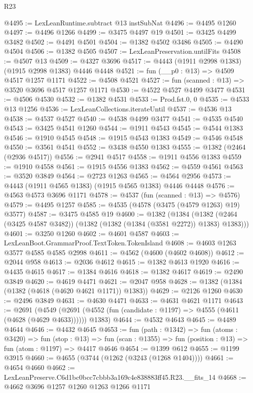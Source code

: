 \begin{lexlean}{R23}
\begin{coremodule}
@4495 := LexLeanRuntime.subtract @13 instSubNat
@4496 := @4495 @1260
@4497 := @4496 @1266
@4499 := @3475 @4497 @19
@4501 := @3425 @4499 @3482
@4502 := @4491 @4501
@4504 := @1382 @4502 @3486
@4505 := @4490 @4504
@4506 := @1382 @4505
@4507 := LexLeanPreservation.untilFits
@4508 := @4507 @13
@4509 := @4327 @3696
@4517 := @4443 (@1911 @2998 @1383) (@1915 @2998 @1383) @4446 @4448
@4521 := fun (__p0 : @13) => @4509 @4517 @1257 @1171
@4522 := @4508 @4521
@4527 := fun (scanned : @13) => @3520 @3696 @4517 @1257 @1171
@4530 := @4522 @4527 @4499 @3477
@4531 := @4506 @4530
@4532 := @1382 @4531
@4533 := Prod.fst.{0, 0}
@4535 := @4533 @13 @1256
@4536 := LexLeanCollections.iterateUntil
@4537 := @4536 @13
@4538 := @4537 @4527
@4540 := @4538 @4499 @3477
@4541 := @4535 @4540
@4543 := @3425 @4541 @1260
@4544 := @1911 @4543
@4545 := @4544 @1383
@4546 := @1910 @4545
@4548 := @1915 @4543 @1383
@4549 := @4546 @4548
@4550 := @3561 @4541
@4552 := @3438 @4550 @1383
@4555 := @1382 (@2464 (@2936 @4517))
@4556 := @2941 @4517
@4558 := @1911 @4556 @1383
@4559 := @1910 @4558
@4561 := @1915 @4556 @1383
@4562 := @4559 @4561
@4563 := @3520 @3849
@4564 := @2723 @1263
@4565 := @4564 @2956
@4573 := @4443 (@1911 @4565 @1383) (@1915 @4565 @1383) @4446 @4448
@4576 := @4563 @4573 @3696 @1171
@4578 := @4537 (fun (scanned : @13) => @4576)
@4579 := @4495 @1257
@4585 := @4535 (@4578 (@3475 (@4579 @1263) @19) @3577)
@4587 := @3475 @4585 @19
@4600 := @1382
    (@1384 (@1382 (@2464 (@3425 @4587 @3482)) (@1382 (@1382 (@1384 (@3581 @2272)) @1383) @1383)))
@4601 := @3250 @1260
@4602 := @4601 @4587
@4603 := LexLeanBoot.GrammarProof.TextToken.TokenIsland
@4608 := @4603 @1263 @3577 @4585 @4585 @2998
@4611 := @4562 (@4600 (@4602 @4608))
@4612 := @2044 @958
@4613 := @2036 @4612
@4615 := @1382 @4613 @1920
@4616 := @4435 @4615
@4617 := @1384 @4616
@4618 := @1382 @4617
@4619 := @2490 @3849
@4620 := @4619 @4471
@4621 := @2047 @958
@4628 := @1382 (@1384 (@1382 (@4618 (@4620 @4621 @1171)) @1383))
@4629 := @2126 @1260
@4630 := @2496 @3849
@4631 := @4630 @4471
@4633 := @4631 @4621 @1171
@4643 := @2691
    (@4549 (@2691 (@4552 (fun (candidate : @1197) => @4555 (@4611 (@4628 (@4629 @4633)))))) @1383)
@4644 := @4532 @4643
@4645 := @4489 @4644
@4646 := @4432 @4645
@4653 := fun (path : @1342) =>
  fun (atoms : @3420) =>
  fun (stop : @13) =>
  fun (scan : @1355) => fun (position : @13) => fun (atom : @1197) => @4417 @4646
@4654 := @1399 @612
@4655 := @1199 @3915
@4660 := @4655 (@3744 (@1262 (@3243 (@1268 @1404))))
@4661 := @4654 @4660
@4662 := LexLeanPreserve.C6d1bc0bcc7cbbb3a169c4e838883ff45.R23.__fits_14
@4668 := @4662 @3696 @1257 @1260 @1263 @1266 @1171

\end{coremodule}
\end{lexlean}
